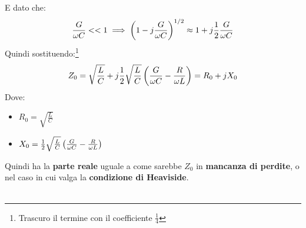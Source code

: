 E dato che:
\begin{equation*}
    \frac{G}{\omega C} << 1 \implies {\left(1 - j \frac{G}{\omega C}\right)}^{1/2} \approx 1 + j \frac{1}{2} \frac{G}{\omega C}
\end{equation*}
Quindi sostituendo:\footnote{Trascuro il termine con il coefficiente $\frac{1}{4}$}
\begin{equation*}
    Z_0 = \sqrt{\frac{L}{C}} + j \frac{1}{2} \sqrt{\frac{L}{C}} \left(\frac{G}{\omega C} - \frac{R}{\omega L} \right) = R_0 + j X_0
\end{equation*} 
Dove:
\begin{itemize}
    \item $R_0 = \sqrt{\frac{L}{C}}$
    \item $X_0 = \frac{1}{2} \sqrt{\frac{L}{C}} \left(\frac{G}{\omega C} - \frac{R}{\omega L} \right)$
\end{itemize}
Quindi ha la \textbf{parte reale} uguale a come sarebbe $Z_0$ in \textbf{mancanza di perdite}, o nel caso in cui valga la \textbf{condizione di Heaviside}.\\ \\

